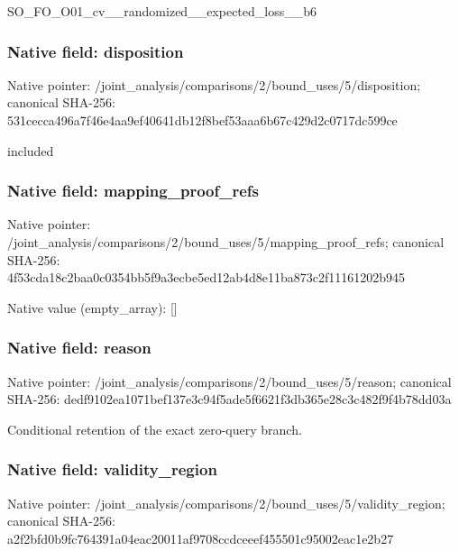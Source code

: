 \documentclass[10pt,a4paper]{article}
\begin{document}
\begingroup\raggedright\sloppy SO\_\allowbreak{}FO\_\allowbreak{}O01\_\allowbreak{}cv\_\allowbreak{}\_\allowbreak{}randomized\_\allowbreak{}\_\allowbreak{}expected\_\allowbreak{}loss\_\allowbreak{}\_\allowbreak{}b6\par\endgroup

\subsubsection{Native field: disposition}
Native pointer: /joint\_\allowbreak{}analysis/comparisons/2/bound\_\allowbreak{}uses/5/disposition; canonical SHA-256: 531cecca496a7f46e4aa9ef40641db12f8bef53aaa6b67c429d2c0717dc599ce

\begingroup\raggedright\sloppy included\par\endgroup

\subsubsection{Native field: mapping\_\allowbreak{}proof\_\allowbreak{}refs}
Native pointer: /joint\_\allowbreak{}analysis/comparisons/2/bound\_\allowbreak{}uses/5/mapping\_\allowbreak{}proof\_\allowbreak{}refs; canonical SHA-256: 4f53cda18c2baa0c0354bb5f9a3ecbe5ed12ab4d8e11ba873c2f11161202b945

Native value (empty\_\allowbreak{}array): []

\subsubsection{Native field: reason}
Native pointer: /joint\_\allowbreak{}analysis/comparisons/2/bound\_\allowbreak{}uses/5/reason; canonical SHA-256: dedf9102ea1071bef137e3c94f5ade5f6621f3db365e28c3c482f9f4b78dd03a

\begingroup\raggedright\sloppy Conditional retention of the exact zero-query branch.\par\endgroup

\subsubsection{Native field: validity\_\allowbreak{}region}
Native pointer: /joint\_\allowbreak{}analysis/comparisons/2/bound\_\allowbreak{}uses/5/validity\_\allowbreak{}region; canonical SHA-256: a2f2bfd0b9fc764391a04eac20011af9708ccdceeef455501c95002eac1e2b27
\end{document}
